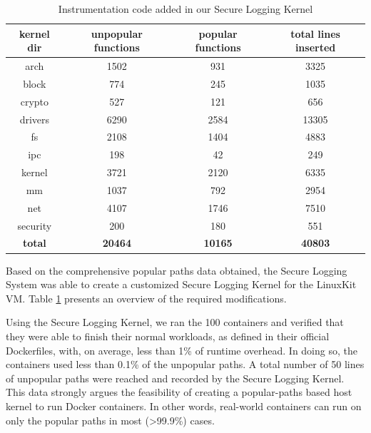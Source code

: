 \begin{table}[h!]
\begin{center}
\caption{Instrumentation code added in our Secure Logging Kernel}
\label{tab:kernel_instrumentation}
\begin{tabular}{c|c|c|c}
 kernel dir & unpopular functions & popular functions & total lines inserted \\
 \hline
 arch & 1502 & 931 & 3325 \\
 \hline
 block & 774 & 245 & 1035 \\
 \hline
 crypto & 527 & 121 & 656 \\ 
 \hline
 drivers & 6290 & 2584 & 13305 \\
 \hline
 fs & 2108 & 1404 & 4883 \\
 \hline
 ipc & 198 & 42 & 249 \\
 \hline
 kernel & 3721 & 2120 & 6335 \\
 \hline
 mm & 1037 & 792 & 2954 \\
 \hline
 net & 4107 & 1746 & 7510 \\
 \hline
 security & 200 & 180 & 551 \\
 \hline
 \textbf{total} & \textbf{20464} & \textbf{10165} & \textbf{40803} \\
\end{tabular}
\end{center}
\end{table}

Based on the comprehensive popular paths data obtained, the Secure Logging System was able to create a customized Secure Logging Kernel for the LinuxKit VM. 
Table \ref{tab:kernel_instrumentation} presents an overview of the required modifications. 

Using  the Secure Logging Kernel, we ran the 100 containers and verified that they were able to finish their normal workloads, 
as defined in their official Dockerfiles, with, on average, less than 1\% of runtime overhead. 
In doing so, the containers used less than 0.1\% of the unpopular paths. 
A total number of 50 lines of unpopular paths were reached and recorded by the Secure Logging Kernel. 
This data strongly argues the feasibility of creating a popular-paths based host kernel to run Docker containers. 
In other words, real-world containers can run on only the popular paths in most (>99.9\%) cases. 

